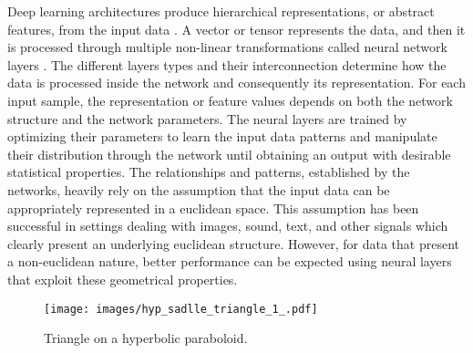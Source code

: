 \documentclass[journal]{IEEEtran}
\begin{document}
Deep learning architectures produce hierarchical representations, or abstract features, from the input data \cite{representation}. A vector or tensor represents the data, and then it is processed through multiple non-linear transformations called neural network layers \cite{visualizing_cnn}. The different layers types and their interconnection determine how the data is processed inside the network and consequently its representation. For each input sample, the representation or feature values depends on both the network structure and the network parameters. The neural layers are trained by optimizing their parameters to learn the input data patterns and manipulate their distribution through the network until obtaining an output with desirable statistical properties. The relationships and patterns, established by the networks, heavily rely on the assumption that the input data can be appropriately represented in a euclidean space. This assumption has been successful in settings dealing with images, sound, text, and other signals which clearly present an underlying euclidean structure. However, for data that present a non-euclidean nature, better performance can be expected using neural layers that exploit these geometrical properties.\newline



\begin{figure}[t]
    \centering
    \texttt{[image: images/hyp\_sadlle\_triangle\_1\_.pdf]}
    \caption{Triangle on a hyperbolic paraboloid.}
    \label{triangle_paraboloid}
\end{figure}
\end{document}
